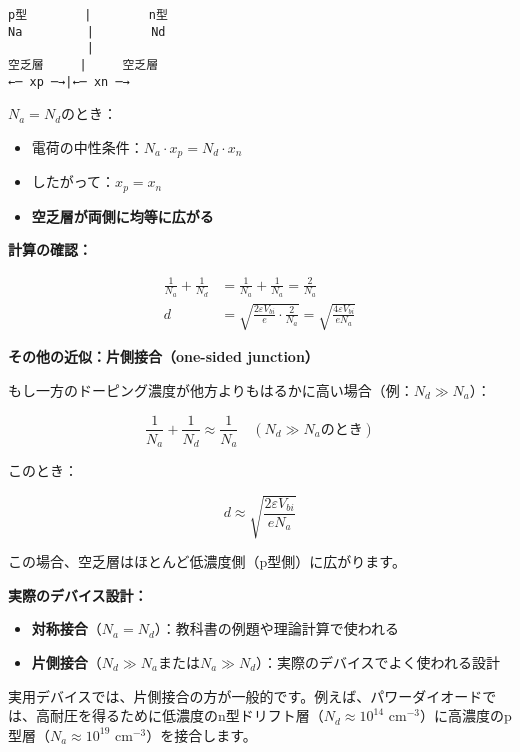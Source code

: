 \begin{verbatim}
p型        |        n型
Na         |        Nd
           |
空乏層     |     空乏層
←─ xp ─→|←─ xn ─→
\end{verbatim}

$N_a = N_d$のとき：

\begin{itemize}
\item 電荷の中性条件：$N_a \cdot x_p = N_d \cdot x_n$
\item したがって：$x_p = x_n$
\item \textbf{空乏層が両側に均等に広がる}
\end{itemize}

\textbf{計算の確認：}

\begin{align}
\frac{1}{N_a} + \frac{1}{N_d} &= \frac{1}{N_a} + \frac{1}{N_a} = \frac{2}{N_a} \\
d &= \sqrt{\frac{2\varepsilon V_{bi}}{e} \cdot \frac{2}{N_a}} = \sqrt{\frac{4\varepsilon V_{bi}}{eN_a}}
\end{align}

\textbf{その他の近似：片側接合（one-sided junction）}

もし一方のドーピング濃度が他方よりもはるかに高い場合（例：$N_d \gg N_a$）：

\begin{equation}
\frac{1}{N_a} + \frac{1}{N_d} \approx \frac{1}{N_a} \quad (\text{$N_d \gg N_a$のとき})
\end{equation}

このとき：

\begin{equation}
d \approx \sqrt{\frac{2\varepsilon V_{bi}}{eN_a}}
\end{equation}

この場合、空乏層はほとんど低濃度側（p型側）に広がります。

\textbf{実際のデバイス設計：}

\begin{itemize}
\item \textbf{対称接合}（$N_a = N_d$）：教科書の例題や理論計算で使われる
\item \textbf{片側接合}（$N_d \gg N_a$または$N_a \gg N_d$）：実際のデバイスでよく使われる設計
\end{itemize}

実用デバイスでは、片側接合の方が一般的です。例えば、パワーダイオードでは、高耐圧を得るために低濃度のn型ドリフト層（$N_d \approx 10^{14}$ cm$^{-3}$）に高濃度のp型層（$N_a \approx 10^{19}$ cm$^{-3}$）を接合します。


